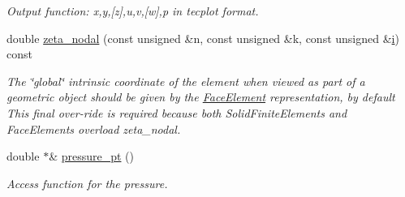 \begin{DoxyCompactItemize}
\begin{DoxyCompactList}\small\item\em Output function\+: x,y,\mbox{[}z\mbox{]},u,v,\mbox{[}w\mbox{]},p in tecplot format. \end{DoxyCompactList}\item 
double \hyperlink{classoomph_1_1ImposeParallelOutflowElement_afa3691d3309b635967e81461b7db8173}{zeta\+\_\+nodal} (const unsigned \&n, const unsigned \&k, const unsigned \&\hyperlink{cfortran_8h_adb50e893b86b3e55e751a42eab3cba82}{i}) const
\begin{DoxyCompactList}\small\item\em The \char`\"{}global\char`\"{} intrinsic coordinate of the element when viewed as part of a geometric object should be given by the \hyperlink{classoomph_1_1FaceElement}{Face\+Element} representation, by default This final over-\/ride is required because both Solid\+Finite\+Elements and Face\+Elements overload zeta\+\_\+nodal. \end{DoxyCompactList}\item 
double $\ast$\& \hyperlink{classoomph_1_1ImposeParallelOutflowElement_a03c7adc09a78f610650b9326cc717007}{pressure\+\_\+pt} ()
\begin{DoxyCompactList}\small\item\em Access function for the pressure. \end{DoxyCompactList}\end{DoxyCompactItemize}
